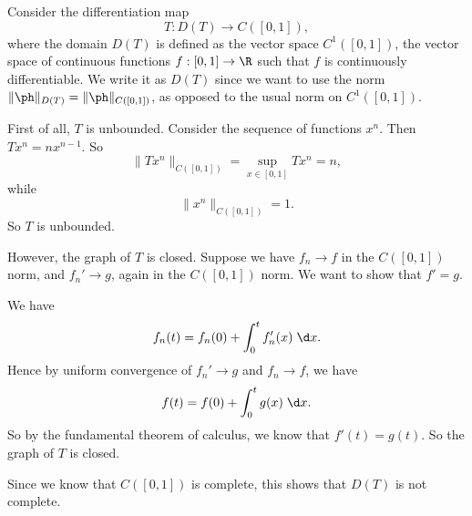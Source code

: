 \documentclass[a4paper]{article}
\begin{document}
\begin{eg}
  Consider the differentiation map
  \[
    T: D(T) \to C([0, 1]),
  \]
  where the domain $D(T)$ is defined as the vector space $C^1([0, 1])$, the vector space of continuous functions $f: [0, 1] \to \R$ such that $f$ is continuously differentiable. We write it as $D(T)$ since we want to use the norm $\|\ph \|_{D(T)} = \|\ph \|_{C([0, 1])}$, as opposed to the usual norm on $C^1([0, 1])$.

  First of all, $T$ is unbounded. Consider the sequence of functions $x^n$. Then $Tx^n = nx^{n - 1}$. So
  \[
    \|T x^n\|_{C([0, 1])} = \sup_{x \in [0, 1]} Tx^n = n,
  \]
  while
  \[
    \|x^n\|_{C([0, 1])} = 1.
  \]
  So $T$ is unbounded.

  However, the graph of $T$ is closed. Suppose we have $f_n \to f$ in the $C([0, 1])$ norm, and $f_n' \to g$, again in the $C([0, 1])$ norm. We want to show that $f' = g$.

  We have
  \[
    f_n(t) = f_n(0) + \int_0^t f'_n(x) \;\d x.
  \]
  Hence by uniform convergence of $f_n' \to g$ and $f_n \to f$, we have
  \[
    f(t) = f(0) + \int_0^t g(x)\;\d x.
  \]
  So by the fundamental theorem of calculus, we know that $f'(t) = g(t)$. So the graph of $T$ is closed.

  Since we know that $C([0, 1])$ is complete, this shows that $D(T)$ is not complete.
\end{eg}
\end{document}
